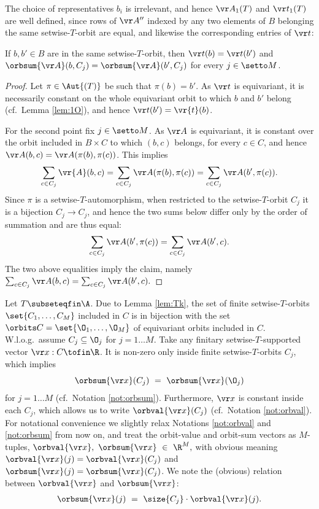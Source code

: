 The choice of representatives $b_i$ is irrelevant, and hence
$\vr A_1(T)$ and  $\vr t_1(T)$ are well defined, 
since rows of $\vr A''$ indexed by any two elements of $B$ belonging the same setwise-$T$-orbit
are equal, and likewise the corresponding entries of $\vr t$:
%
\begin{lemma}\label{lem:equalised row}
If $b, b' \in B$ are in the same setwise-$T$-orbit, then 
$\vr t(b) = \vr t(b')$ and
$\orbsum {\vr A}(b, C_j) = \orbsum {\vr A}(b', C_j)$
for every $j\in \setto M$.
\end{lemma}
%
\begin{proof}%
Let $\pi \in \Aut{(T)}$ be such that $\pi(b) = b'$.
As $\vr t$ is equivariant, it is necessarily constant on the whole equivariant orbit to which $b$ and $b'$ belong
(cf.~Lemma \ref{lem:1O}), 
and hence $\vr t(b') = \vr{t}(b)$.

For the second point fix $j\in \setto M$.
As $\vr A$ is equivariant, it is constant over the orbit included in $B\times C$ to which $(b,c)$ belongs, 
for every $c\in C$, and hence
$\vr A(b,c) = \vr A(\pi(b), \pi(c))$. This implies
\[
\sum_{c \in C_j} \vr{A}(b,c) = 
\sum_{c \in C_j} \vr A(\pi(b),\pi(c)) = 
\sum_{c \in C_j} \vr A(b',\pi(c)).
\]
Since $\pi$ is a setwise-$T$-automorphism, when restricted to
the setwise-$T$-orbit $C_j$ it is a bijection $C_j \to C_j$,
and hence the two sums below differ only by the order of summation and are thus equal:
\[
\sum_{c \in C_j} \vr A(b',\pi(c)) = 
\sum_{c \in C_j} \vr A(b',c).
\]
The two above equalities imply the claim, namely
$
\sum_{c \in C_j} \vr A(b,c) = 
\sum_{c \in C_j} \vr A(b',c).
$ 
\end{proof}
%

\begin{notation} \label{not:M}
Let $T\subseteqfin \A$.
Due to Lemma \ref{lem:Tk},
the set of finite setwise-$T$-orbits $\set{C_1, \ldots, C_M}$ included in $C$
is in bijection with 
the set $\orbits C = \set{\O_1, \ldots, \O_M}$ of equivariant orbits included in $C$.
W.l.o.g.~assume $C_j\subseteq \O_j$ for $j = 1\ldots M$.
Take any finitary setwise-$T$-supported vector $\vr x : C \tofin \R$.
It is non-zero only inside finite setwise-$T$-orbits $C_j$, which implies
\[
\orbsum {\vr x}(C_j) \ = \ \orbsum {\vr x}(\O_j)
\]
for $j=1\ldots M$  (cf.~Notation \ref{not:orbsum}).
Furthermore, $\vr x$ is constant inside each $C_j$, which allows us to write
$\orbval {\vr x}(C_j)$ (cf.~Notation \ref{not:orbval}).
For notational convenience we slightly relax Notations \ref{not:orbval} and \ref{not:orbsum}
from now on, and treat the orbit-value and orbit-sum vectors as $M$-tuples,
$
\orbval{\vr x}, \ \orbsum{\vr x} \ \in \ \R^M,
$
with obvious meaning $\orbval{\vr x}(j) = \orbval{\vr x}(C_j)$ and $\orbsum{\vr x}(j) = \orbsum{\vr x}(C_j)$.
We note the (obvious) relation between $\orbval{\vr x}$ and $\orbsum{\vr x}$:
\begin{align} \label{eq:overbefore}
\orbsum{\vr x}(j) \ = \ \size{C_j} \cdot \orbval{\vr x}(j).
\end{align}
\end{notation}

